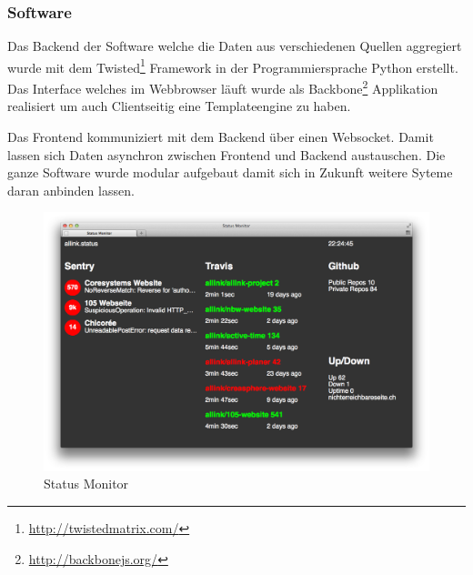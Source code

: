 \subsubsection{Software}
\label{ssub:software}
Das Backend der Software welche die Daten aus verschiedenen Quellen aggregiert wurde mit dem Twisted\footnote{\url{http://twistedmatrix.com/}} Framework in der Programmiersprache Python erstellt. Das Interface welches im Webbrowser läuft wurde als Backbone\footnote{\url{http://backbonejs.org/}} Applikation realisiert um auch Clientseitig eine Templateengine zu haben.

Das Frontend kommuniziert mit dem Backend über einen Websocket. Damit lassen sich Daten asynchron zwischen Frontend und Backend austauschen. Die ganze Software wurde modular aufgebaut damit sich in Zukunft weitere Syteme daran anbinden lassen.

\begin{figure}[ht]
\centering
\includegraphics[width=1\textwidth]{images/status_monitor.png}
\caption{Status Monitor}
\label{fig:status_monitor}
\end{figure}
